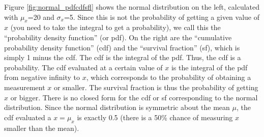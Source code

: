 Figure \ref{fig:normal_pdfcdfsfl} shows the normal distribution on the left, calculated with $\mu_x$=20 and $\sigma_x$=5. Since this is not the probability of getting a given value of $x$ (you need to take the integral to get a probability), we call this the ``probability density function'' (or pdf). On the right are the ``cumulative probability density function'' (cdf) and the ``survival fraction'' (sf), which is simply 1 minus the cdf. The cdf is the integral of the pdf. Thus, the cdf is a probability. The cdf evaluated at a certain value of $x$ is the integral of the pdf from negative infinity to $x$, which corresponds to the probability of obtaining a measurement $x$ or smaller. The survival fraction is thus the probability of getting $x$ or bigger. There is no closed form for the cdf or sf corresponding to the normal distribution. Since the normal distribution is symmetric about the mean $\mu$, the cdf evaluated a $x=\mu_x$ is exactly 0.5 (there is a 50\% chance of measuring $x$ smaller than the mean).

